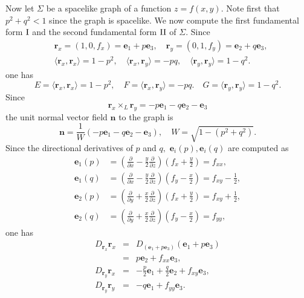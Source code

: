 \documentclass[11pt]{amsart}
\begin{document}
Now let $\Sigma$ be a spacelike graph of a function
 $z=f(x,y).$
Note first that $p^2+q^2<1$ since the graph is spacelike. We now
compute the first fundamental form ${\rm I}$ and the second
fundamental form ${\rm II}$ of $\Sigma.$ Since
\[
\begin{split}
&{\mathbf{r}}_x=(1,0,f_x)={\mathbf{e}}_1+p{\mathbf{e}}_3, \quad
{\mathbf{r}}_y=(0,1,f_y)={\mathbf{e}}_2+q{\mathbf{e}}_3,
\\
&\langle{\mathbf{r}}_x,{\mathbf{r}}_x\rangle=1-p^2,\quad
\langle{\mathbf{r}}_x,{\mathbf{r}}_y\rangle=-pq,\quad
\langle{\mathbf{r}}_y,{\mathbf{r}}_y\rangle=1-q^2.
\end{split}
\]
one has
$$
E=\langle{\mathbf{r}}_x,{\mathbf{r}}_x\rangle=1-p^2,\quad
F=\langle{\mathbf{r}}_x,{\mathbf{r}}_y\rangle=-pq.\quad
G=\langle{\mathbf{r}}_y,{\mathbf{r}}_y\rangle=1-q^2. $$
Since
\[
{\mathbf{r}}_x\times_L{\mathbf{r}}_y =-p{\mathbf{e}}_1-q{\mathbf{e}}_2-{\mathbf{e}}_3
\]
the unit normal vector field ${\mathbf{n}}$ to the graph is
\[
{\mathbf{n}}=\frac1{W} \left(-p{\mathbf{e}}_1-q{\mathbf{e}}_2-{\mathbf{e}}_3\right), \quad
W=\sqrt{1-(p^2+q^2)}.
\]
Since the directional derivatives of $p$ and $q,$ ${\mathbf{e}}_i(p),
{\mathbf{e}}_i(q)$ are computed as
\[
\begin{split}
{\mathbf{e}}_1(p) & = \left(\frac{\partial}{\partial x}-\frac{y}2\frac{\partial}{\partial z}\right)\left(f_x+\frac{y}2\right)=f_{xx},\\
{\mathbf{e}}_1(q) & = \left(\frac{\partial}{\partial
x}-\frac{y}2\frac{\partial}{\partial z}\right)
\left(f_y-\frac{x}2\right)=f_{xy}-\frac12,\\
{\mathbf{e}}_2(p) & = \left(\frac{\partial}{\partial
y}+\frac{x}2\frac{\partial}{\partial
z}\right)\left(f_x+\frac{y}2\right)=f_{xy}+\frac12,\\
 {\mathbf{e}}_2(q) &
= \left(\frac{\partial}{\partial
y}+\frac{x}2\frac{\partial}{\partial z}\right)
\left(f_y-\frac{x}2\right)=f_{yy},
\end{split}
\]
one has
\begin{eqnarray*}
D_{{\mathbf{r}}_x}{\mathbf{r}}_x&=&D_{({\mathbf{e}}_1+p{\mathbf{e}}_3)}({\mathbf{e}}_1+p{\mathbf{e}}_3)\\
&=&p{\mathbf{e}}_2+f_{xx}{\mathbf{e}}_3,\\
D_{{\mathbf{r}}_y}{\mathbf{r}}_x&=& -\frac{p}2{\mathbf{e}}_1+\frac{q}2{\mathbf{e}}_2+f_{xy}{\mathbf{e}}_3, \\
D_{{\mathbf{r}}_y}{\mathbf{r}}_y&=& -q{\mathbf{e}}_1+f_{yy}{\mathbf{e}}_3.
\end{eqnarray*}
\end{document}
